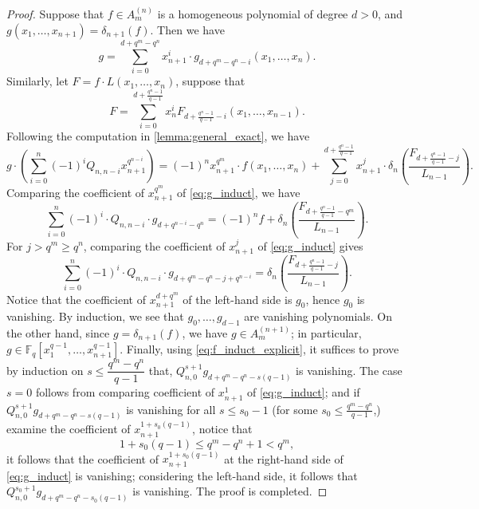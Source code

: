 \documentclass[12pt,a4paper]{report}
\theoremstyle{definition}
\theoremstyle{remark}
\theoremstyle{definition}
\begin{document}
\begin{proof}
    Suppose that $f\in A_{m}^{(n)}$ is a homogeneous polynomial of degree $d > 0$, and $g(x_1, \ldots, x_{n+1}) = \delta_{n+1}(f)$. Then we have
    \begin{equation*}
        g = \sum\limits_{i=0}^{d+q^m - q^n}x_{n+1}^{i}\cdot g_{d+q^m-q^n-i}(x_1, \ldots, x_n).
    \end{equation*}
    Similarly, let $F = f\cdot L(x_1, \ldots, x_n)$, suppose that 
    \begin{equation*}
        F = \sum\limits_{i=0}^{d+\frac{q^n-1}{q-1}}x_n^{i}F_{d+\frac{q^n-1}{q-1}-i}(x_1, \ldots, x_{n-1}).
    \end{equation*}
    Following the computation in \cref{lemma:general_exact}, we have
    \begin{equation}\label{eq:g_induct}
        g\cdot \left(\sum\limits_{i=0}^{n}(-1)^i Q_{n, n-i}x_{n+1}^{q^{n-i}}\right) =  (-1)^{n}x_{n+1}^{q^m}\cdot f(x_1, \ldots, x_n) + \sum\limits_{j=0}^{d+\frac{q^n-1}{q-1}}x_{n+1}^j\cdot  \delta_n\left(\dfrac{F_{d+\frac{q^n-1}{q-1}-j}}{L_{n-1}}\right).
    \end{equation}
    Comparing the coefficient of $x_{n+1}^{q^m}$ of \eqref{eq:g_induct}, we have
    \begin{equation*}
    \sum\limits_{i=0}^{n}(-1)^i \cdot Q_{n, n-i}\cdot g_{d+q^{n-i} - q^n} = (-1)^n f + \delta_n\left(\dfrac{F_{d+\frac{q^n-1}{q-1}-q^m}}{L_{n-1}}\right).    
    \end{equation*}
    For $j>q^m \geq q^n$, comparing the coefficient of $x_{n+1}^j$ of \eqref{eq:g_induct} gives
    \begin{equation}\label{eq:f_induct_explicit}
    \sum\limits_{i=0}^{n}(-1)^i \cdot Q_{n, n-i}\cdot g_{d+q^m - q^n - j+q^{n-i}} =  \delta_n\left(\dfrac{F_{d+\frac{q^n-1}{q-1}-j}}{L_{n-1}}\right).    
    \end{equation}
    Notice that the coefficient of $x_{n+1}^{d+q^m}$ of the left-hand side is $ g_0$, hence $g_0$ is vanishing. By induction, we see that $g_0, \ldots, g_{d-1}$ are vanishing polynomials. On the other hand, since $g = \delta_{n+1}(f)$, we have $g\in A_{m}^{(n+1)}$; in particular, $g\in \mathbb{F}_q[x_1^{q-1}, \ldots, x_{n+1}^{q-1}]$. Finally, using \eqref{eq:f_induct_explicit}, it suffices to prove by induction on $s\leq \dfrac{q^m-q^n}{q-1}$ that, 
    $Q_{n, 0}^{s+1}g_{d+q^m-q^n - s(q-1)}$ is vanishing. The case $s = 0$ follows from comparing coefficient of $x_{n+1}^{1}$ of \eqref{eq:g_induct}; and if $Q_{n, 0}^{s+1}g_{d+q^m-q^n - s(q-1)}$ is vanishing for all $s\leq s_0-1$ (for some $s_0\leq \frac{q^m-q^n}{q-1}$,) examine the coefficient of $x_{n+1}^{1+s_0(q-1)}$, notice that 
    \begin{equation*}
        1+s_0(q-1)\leq q^m - q^n + 1 < q^m,
    \end{equation*}
    it follows that the coefficient of $x_{n+1}^{1+s_0(q-1)}$ at the right-hand side of \eqref{eq:g_induct} is vanishing; considering the left-hand side, it follows that $Q_{n, 0}^{s_0+1}g_{d+q^m-q^n - s_0(q-1)}$ is vanishing. The proof is completed.
\end{proof}
\end{document}
